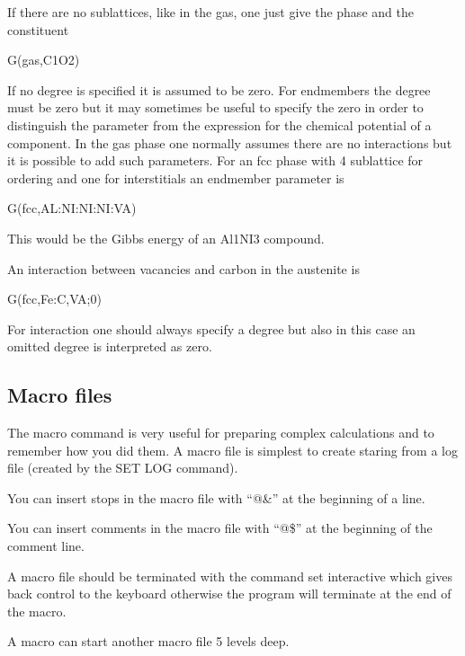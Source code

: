 \documentclass[12pt]{article}
\begin{document}
If there are no sublattices, like in the gas, one just give the phase
and the constituent

G(gas,C1O2)

If no degree is specified it is assumed to be zero.  For endmembers
the degree must be zero but it may sometimes be useful to specify the
zero in order to distinguish the parameter from the expression for the
chemical potential of a component.  In the gas phase one normally
assumes there are no interactions but it is possible to add such
parameters.  For an fcc phase with 4 sublattice for ordering and one
for interstitials an endmember parameter is

G(fcc,AL:NI:NI:NI:VA)

This would be the Gibbs energy of an Al1NI3 compound.

An interaction between vacancies and carbon in the austenite is

G(fcc,Fe:C,VA;0)

For interaction one should always specify a degree but also in this
case an omitted degree is interpreted as zero.

\subsection{Macro files}

The macro command is very useful for preparing complex calculations
and to remember how you did them.  A macro file is simplest to create
staring from a log file (created by the SET LOG command).  

You can insert stops in the macro file with ``@\&'' at the beginning
of a line.

You can insert comments in the macro file with ``@\$'' at the beginning
of the comment line.

A macro file should be terminated with the command set interactive
which gives back control to the keyboard otherwise the program will
terminate at the end of the macro.

A macro can start another macro file 5 levels deep.
\end{document}
